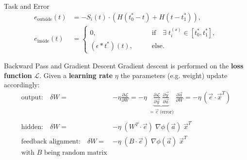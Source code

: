 \documentclass[12pt, aspectratio=169]{beamer}
\begin{document}
\begin{frame}{Task and Error}
	\begin{align*}
	e_\text{outside}(t) &= - S_i(t) \cdot \left(H(t^*_0 - t) + H(t - t^*_1)\right), \\
	e_\text{inside}(t) &= 
	\begin{cases}
	0 ,&\quad \quad \text{if} \quad \exists \; t^{(s)}_i \in [t^*_0, t^*_1], \\
	(\epsilon \ast t^*)(t) ,& \quad \quad \text{else}.
	\end{cases}
	\end{align*}
\end{frame}

\begin{frame}{Backward Pass and Gradient Descent}
Gradient descent is performed on the \textbf{loss function} $\mathcal{L}$. Given a \textbf{learning rate} $\eta$ the parameters (e.g. weight) update accordingly:\\
\begin{align*}
   \text{output:} \quad \delta W =& - \eta \frac{\partial \mathcal{L}}{\partial W} 
            = - \eta \;
            \underbrace{\frac{\partial\mathcal{L}}{\partial \vec{y}} \;
                        \frac{\partial \vec{y}}{\partial \vec{a} }}_{=\vec{e}\; \text{(error)}} \;
              \frac{\partial \vec{a}}{\partial W}
            = - \eta \, (\vec{e} \cdot \vec{x}^T)\\
            \\ 
   \text{hidden:} \quad \delta W =& - \eta \;
                                (W^T \cdot \vec{e}) \;
                                \nabla \phi(\vec{a}) \;
                                \vec{x}^T\\
   \text{feedback alignment:} \quad \delta W =& - \eta \;
                                (B \cdot \vec{e}) \;
                                \nabla \phi(\vec{a}) \;
                                \vec{x}^T\;\\
    \text{with } B \text{ being random matrix}
\end{align*}
\end{frame}
\end{document}
